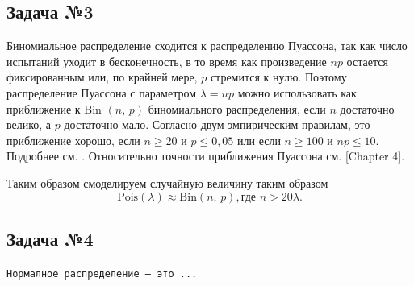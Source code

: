 \subsection{Задача №3}
Биномиальное распределение сходится к распределению Пуассона, так как число испытаний уходит в бесконечность, в то время как произведение $np$ остается фиксированным или, по крайней мере, $p$ стремится к нулю. Поэтому распределение Пуассона с параметром $\lambda = np$ можно использовать как приближение к $\mbox{Bin }(n,\,p)$ биномиального распределения, если $n$ достаточно велико, а $p$ достаточно мало. Согласно двум эмпирическим правилам, это приближение хорошо, если $n \geqslant 20$ и $p \leqslant 0,05$ или если $n \geqslant 100$ и $np \leqslant 10$. Подробнее см. \cite{counts_control_charts}. Относительно точности приближения Пуассона см. \cite{novak}[Chapter 4].

Таким образом смоделируем случайную величину таким образом
$$
        \mbox{Pois}(\lambda) \approx \mbox{Bin}(n,\,p), \mbox{где }n > 20\lambda.
$$

\subsection{Задача №4}
\begin{definition}
        \texttt{Нормалное распределение --- это ...}
\end{definition}

